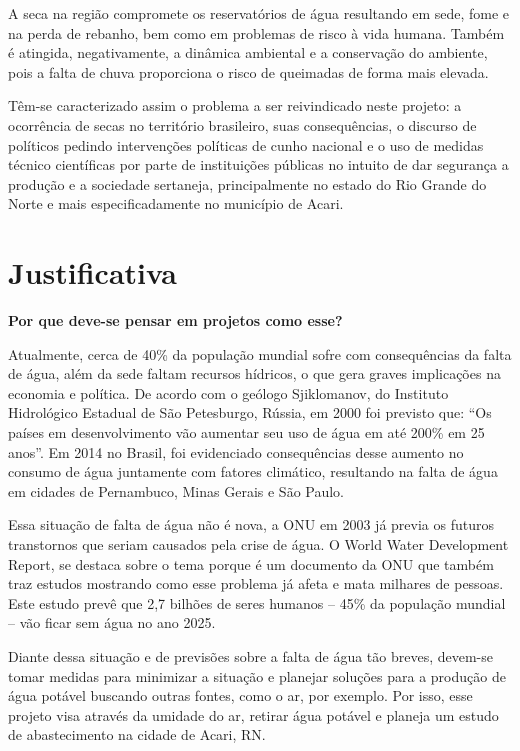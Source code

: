 A seca na região compromete os reservatórios de água resultando em sede, fome e na perda de rebanho, bem como em problemas
de risco à vida humana. Também é atingida, negativamente, a dinâmica ambiental e a conservação do ambiente, pois a falta de 
chuva proporciona o risco de queimadas de forma mais elevada.

Têm-se caracterizado assim o problema a ser reivindicado neste projeto: a ocorrência de secas no território brasileiro,
suas consequências, o discurso de políticos pedindo intervenções políticas de cunho nacional e o uso de medidas técnico 
científicas por parte de instituições públicas no intuito de dar segurança a produção e a sociedade sertaneja, principalmente 
no estado do Rio Grande do Norte e mais especificadamente no município de Acari.


\section{Justificativa}

\textbf{Por que deve-se pensar em projetos como esse?}

Atualmente, cerca de 40\% da população mundial sofre com consequências da falta de água, além da sede faltam recursos hídricos,
o que gera graves implicações na economia e política. De acordo com o geólogo Sjiklomanov, do Instituto Hidrológico Estadual 
de São Petesburgo, Rússia, em 2000 foi previsto que: “Os países em desenvolvimento vão aumentar seu uso de água em até 200\% em
25 anos”. Em 2014 no Brasil, foi evidenciado consequências desse aumento no consumo de água juntamente com fatores climático,
resultando na falta de água em cidades de Pernambuco, Minas Gerais e São Paulo.

Essa situação de falta de água não é nova, a ONU em 2003 já previa os futuros transtornos que seriam causados pela crise de 
água. O World Water Development Report, se destaca sobre o tema porque é um documento da ONU que também traz estudos mostrando
como esse problema já afeta e mata milhares de pessoas. Este estudo prevê que 2,7 bilhões de seres humanos – 45\% da população 
mundial – vão ficar sem água no ano 2025.

Diante dessa situação e de previsões sobre a falta de água tão breves, devem-se tomar medidas para minimizar a situação e
planejar soluções para a produção de água potável buscando outras fontes, como o ar, por exemplo. Por isso, esse projeto visa
através da umidade do ar, retirar água potável e planeja um estudo de abastecimento na cidade de Acari, RN.

